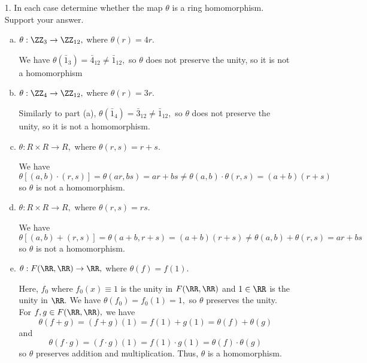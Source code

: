 \documentclass{article}
\begin{document}
\begin{itemize}
	\item[1.] In each case determine whether the map $\theta$ is a ring homomorphism. Support your answer.
		\begin{enumerate}[(a)]
			\item $\theta:\ZZ_3\to\ZZ_{12},$ where $\theta(r)=4r.$
				\begin{answer*}
					We have $\theta(\bar{1}_3)=\bar{4}_{12}\neq \bar{1}_{12},$ so $\theta$ does not preserve the unity, so it is not a homomorphism
				\end{answer*}

			\item $\theta:\ZZ_4\to\ZZ_{12},$ where $\theta(r)=3r.$
				\begin{answer*}
					Similarly to part (a), $\theta(\bar{1}_4)=\bar{3}_{12}\neq \bar{1}_{12},$ so $\theta$ does not preserve the unity, so it is not a homomorphism.
				\end{answer*}

			\item $\theta:R\times R\to R,$ where $\theta(r, s)=r+s.$
				\begin{answer*}
					We have \[\theta\left[ (a, b)\cdot (r, s) \right] = \theta(ar, bs) = ar+bs\neq \theta(a, b)\cdot \theta(r, s)=(a+b)(r+s)\] so $\theta$ is not a homomorphism.
				\end{answer*}

			\item $\theta:R\times R\to R,$ where $\theta(r, s)=rs.$
				\begin{answer*}
					We have \[\theta\left[ (a, b)+(r, s) \right]= \theta(a+b, r+s)=(a+b)(r+s)\neq \theta(a, b)+\theta(r, s)=ar+bs\] so $\theta$ is not a homomorphism.
				\end{answer*}

			\item $\theta:F(\RR, \RR)\to \RR,$ where $\theta(f)=f(1).$
				\begin{soln}
					Here, $f_0$ where $f_0(x)\equiv 1$ is the unity in $F(\RR, \RR)$ and $1\in \RR$ is the unity in $\RR.$ We have $\theta(f_0)=f_0(1)=1,$ so $\theta$ preserves the unity. For $f, g\in F(\RR, \RR),$ we have \[\theta(f+g)=(f+g)(1)=f(1)+g(1) = \theta(f)+\theta(g)\] and \[\theta(f\cdot g)= (f\cdot g)(1)=f(1)\cdot g(1) = \theta(f)\cdot \theta(g)\] so $\theta$ preserves addition and multiplication. Thus, $\theta$ is a homomorphism.
				\end{soln}
				
		\end{enumerate}


\end{itemize}
\end{document}
